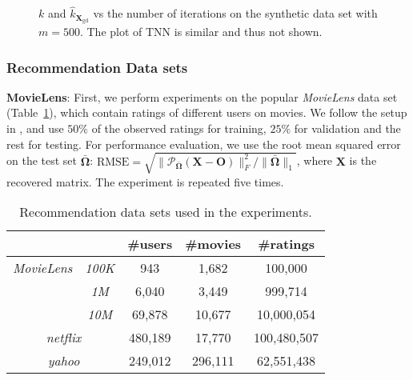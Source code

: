 \documentclass[10pt,journal,compsoc]{IEEEtran}
\newcommand{\X}{\mathbf{X}}
\newcommand{\NM}[2]{\| #1 \|_{#2} }
\begin{document}
\begin{figure}[ht]
\centering

\vspace{-10px}
\caption{$k$ and $\hat{k}_{\X_{\text{gd}}}$ 
	vs the number of iterations 
	on the synthetic data set with $m = 500$.
	The plot of TNN is similar and thus not shown.}
\label{fig:rankmatcomp}
\end{figure}


\subsubsection{Recommendation Data sets}
\label{sec:recsys}

\noindent
\textbf{MovieLens}:
First, we perform
experiments on the popular
\textit{MovieLens}
data set
(Table~\ref{tab:recSys}),
which contain ratings of different users on movies.
We follow the setup in \cite{wang2015orthogonal},  
and use $50\%$ of the observed ratings for training, $25\%$ for validation and the rest for testing.
For performance evaluation, we use the root mean squared error on the test set
$\bar{\mathbf{\Omega}}$:
$\text{RMSE} = \sqrt{ \NM{\mathcal{P}_{\bar{\mathbf{\Omega}}}(\mathbf{X} - \mathbf{O})}{F}^2 / \NM{\mathbf{\bar{\Omega}}}{1}}$,
where $\mathbf{X}$ is the recovered matrix.
The experiment is repeated five times.

\begin{table}[ht]
\centering
\caption{Recommendation data sets used in the experiments.}
\vspace{-10px}
\begin{tabular}{cc | c | c | c }
\hline
                &                  & \#users & \#movies & \#ratings   \\ \hline
\textit{MovieLens} &  \textit{100K}   & 943     & 1,682    & 100,000     \\ \cline{2-5}
                &   \textit{1M}    & 6,040   & 3,449    & 999,714     \\ \cline{2-5}
                &   \textit{10M}   & 69,878  & 10,677   & 10,000,054  \\ \hline
\multicolumn{2}{c|}{\textit{netflix}} & 480,189 & 17,770   & 100,480,507 \\ \hline
\multicolumn{2}{c|}{\textit{yahoo}}  & 249,012 & 296,111  & 62,551,438  \\ \hline
\end{tabular}
\label{tab:recSys}
\end{table}
\end{document}
